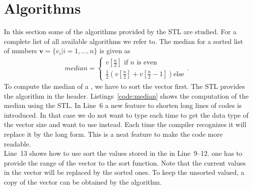 



\section{Algorithms}
\label{sec:stl:algorithms}
In this section some of the algorithms provided by the STL are studied. For a complete list of all available algorithms we refer to. The median for a sorted list of numbers $\mathbf{v}=\{v_i \vert i =1,\ldots,n\}$ is given as
\begin{align}
median = \begin{cases}
v[\frac{n}{2}] \text{ if } n \text{ is even} \\
\frac{1}{2}\left( v[\frac{n}{2}] + v[\frac{n}{2}-1] \right) \text{else}
\end{cases} \text{.}
\end{align}
To compute the median of a , we have to sort the vector first. The STL provides the  algorithm in the  header. Listings~\ref{code:median} shows the computation of the median using the STL. In Line~6 a new feature  to shorten long lines of codes is introduced. In that case we do not want to type each time  to get the data type of the vector size and want to use  instead. Each time the compiler recognizes  it will replace it by the long form. This is a neat feature to make the code more readable.\\

Line~13 shows how to use sort the values stored in the  in Line~9--12. one has to provide the range of the vector to the sort function. Note that the current values in the vector will be replaced by the sorted ones. To keep the unsorted valued, a copy of the vector can be obtained by the  algorithm.\\


